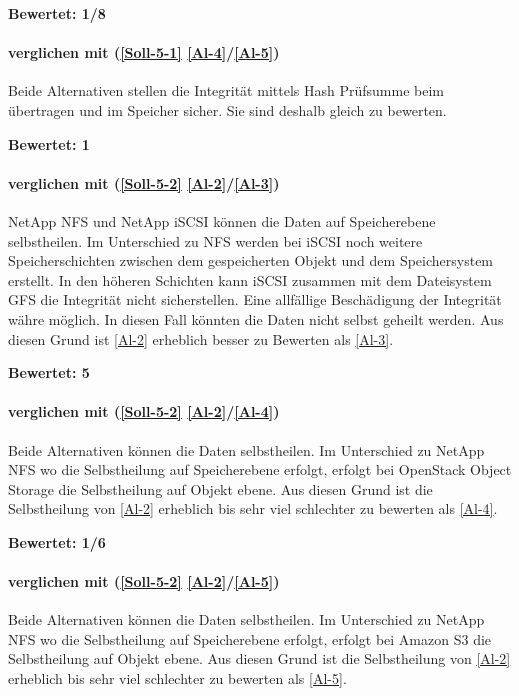 \textbf{Bewertet: 1/8}

\paragraph*{  verglichen mit  (\ref{Soll-5-1} \ref{Al-4}/\ref{Al-5})}
Beide Alternativen stellen die Integrität mittels Hash Prüfsumme beim übertragen und im Speicher sicher. Sie sind deshalb gleich zu bewerten.

\textbf{Bewertet: 1}


\paragraph*{  verglichen mit  (\ref{Soll-5-2} \ref{Al-2}/\ref{Al-3})}
NetApp NFS und NetApp iSCSI können die Daten auf Speicherebene selbstheilen. Im Unterschied zu NFS werden bei iSCSI noch weitere Speicherschichten zwischen dem gespeicherten Objekt und dem Speichersystem erstellt. In den höheren Schichten kann iSCSI zusammen mit dem Dateisystem GFS die Integrität nicht sicherstellen. Eine allfällige Beschädigung der Integrität währe möglich. In diesen Fall könnten die Daten nicht selbst geheilt werden. Aus diesen Grund ist  \ref{Al-2} erheblich besser zu Bewerten als  \ref{Al-3}.

\textbf{Bewertet: 5}

\paragraph*{  verglichen mit  (\ref{Soll-5-2} \ref{Al-2}/\ref{Al-4})}
Beide Alternativen können die Daten selbstheilen. Im Unterschied zu NetApp NFS wo die Selbstheilung auf Speicherebene erfolgt, erfolgt bei OpenStack Object Storage die Selbstheilung auf Objekt ebene. Aus diesen Grund ist die Selbstheilung von  \ref{Al-2} erheblich bis sehr viel schlechter zu bewerten als  \ref{Al-4}.

\textbf{Bewertet: 1/6}


\paragraph*{  verglichen mit  (\ref{Soll-5-2} \ref{Al-2}/\ref{Al-5})}
Beide Alternativen können die Daten selbstheilen. Im Unterschied zu NetApp NFS wo die Selbstheilung auf Speicherebene erfolgt, erfolgt bei Amazon S3 die Selbstheilung auf Objekt ebene. Aus diesen Grund ist die Selbstheilung von  \ref{Al-2} erheblich bis sehr viel schlechter zu bewerten als  \ref{Al-5}.

